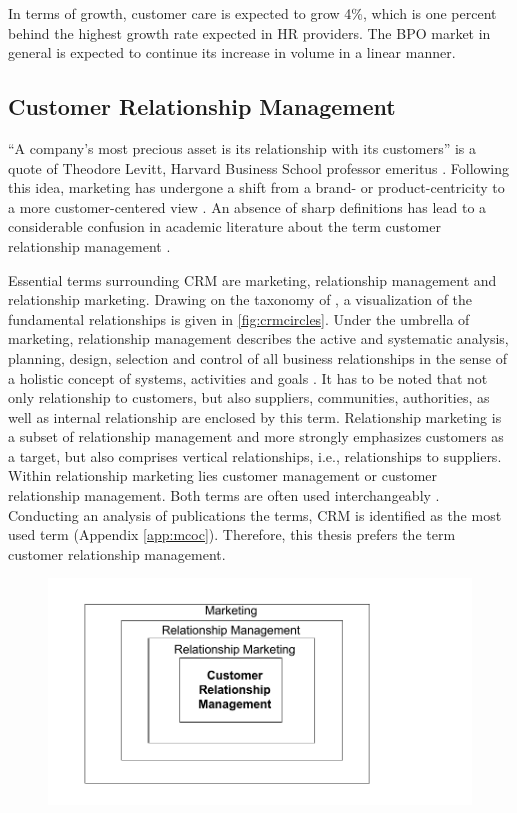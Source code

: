 		In terms of growth, customer care is expected to grow 4\%, which is one percent behind the highest growth rate expected in HR providers. The \acrshort{BPO} market in general is expected to continue its increase in volume in a linear manner. 
		\subsection{Customer Relationship Management}
		\label{sec:crm}
		\enquote{A company's most precious asset is its relationship with its customers} is a quote of Theodore Levitt, Harvard Business School professor emeritus \citep{levitt1983}. Following this idea, marketing has undergone a shift from a brand- or product-centricity to a more customer-centered view \citep{Chen_2003}. An absence of sharp definitions has lead to a considerable confusion in academic literature about the term customer relationship management \citep{paynefrow2005}. 
		
		Essential terms surrounding CRM are marketing, relationship management and relationship marketing. Drawing on the taxonomy of \citep{Leuer2011}, a visualization of the fundamental relationships is given in \Fig \ref{fig:crmcircles}. Under the umbrella of marketing, relationship management describes the active and systematic analysis, planning, design, selection and control of all business relationships in the sense of a holistic concept of systems, activities and goals \citep[]{diller1995}. It has to be noted that not only relationship to customers, but also suppliers, communities, authorities, as well as internal relationship are enclosed by this term. Relationship marketing is a subset of relationship management and more strongly emphasizes customers as a target, but also comprises vertical relationships, i.e., relationships to suppliers. Within relationship marketing lies customer management or customer relationship management. Both terms are often used interchangeably  \citep{Leuer2011,ryals2001customer}. Conducting an analysis of publications \wrt the terms, \acrshort{CRM} is identified as the most used term (\cf Appendix \ref{app:mcoc}). Therefore, this thesis prefers the term customer relationship management.
		
		\begin{figure}[caption={CRM in the Field of Marketing}, label={fig:crmcircles}]
			{	\includegraphics[width=.8\textwidth]{figures/crmcircles.pdf}}
		\end{figure}
	
